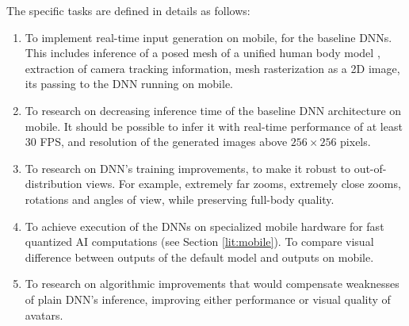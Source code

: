 The specific tasks are defined in details as follows:
\begin{enumerate}
	\item To implement real-time input generation on mobile, for the baseline DNNs. This includes inference of a posed mesh of a unified human body model \cite{dnn:smplx19}, extraction of camera tracking information, mesh rasterization as a 2D image, its passing to the DNN running on mobile.
	\item To research on decreasing inference time of the baseline \cite{dnn:stylepeople21} DNN architecture on mobile. It should be possible to infer it with real-time performance of at least 30 FPS, and resolution of the generated images above $256\times256$ pixels.
	\item To research on DNN's training improvements, to make it robust to out-of-distribution views. For example, extremely far zooms, extremely close zooms, rotations and angles of view, while preserving full-body quality.
	\item To achieve execution of the DNNs on specialized mobile hardware for fast quantized AI computations (see Section \ref{lit:mobile}). To compare visual difference between outputs of the default model and outputs on mobile.
	\item To research on algorithmic improvements that would compensate weaknesses of plain DNN's inference, improving either performance or visual quality of avatars.

\end{enumerate}

\newpage


